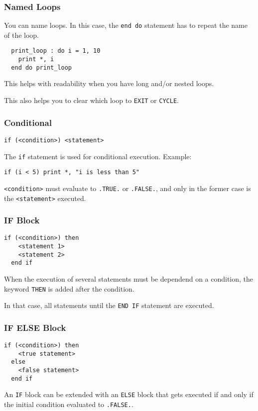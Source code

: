 \begin{frame}[fragile]
  \frametitle{Named Loops}

  You can name loops.
  In this case, the \texttt{end do} statement has to repeat the name of the loop.

  \begin{lstlisting}
  print_loop : do i = 1, 10
    print *, i
  end do print_loop
  \end{lstlisting}

  This helps with readability when you have long and/or nested loops.

  This also helps you to clear which loop to \texttt{EXIT} or \texttt{CYCLE}.

\end{frame}

\begin{frame}[fragile]
  \frametitle{Conditional}

  \begin{lstlisting}[numbers=none]
  if (<condition>) <statement>
  \end{lstlisting}
  The \texttt{if} statement is used for conditional execution.
  Example:
  \begin{lstlisting}[numbers=none]
  if (i < 5) print *, "i is less than 5"
  \end{lstlisting}

  \texttt{<condition>} must evaluate to \texttt{.TRUE.} or \texttt{.FALSE.}, and only in the former case is the \texttt{<statement>} executed.

\end{frame}

\begin{frame}[fragile]
  \frametitle{IF Block}

  \begin{lstlisting}[numbers=none]
  if (<condition>) then
    <statement 1>
    <statement 2>
  end if
  \end{lstlisting}

  When the execution of several statements must be dependend on
  a condition, the keyword \texttt{THEN} is added after the condition.

  In that case, all statements until the \texttt{END IF} statement are
  executed.

\end{frame}

\begin{frame}[fragile]
  \frametitle{IF ELSE Block}

  \begin{lstlisting}[numbers=none]
  if (<condition>) then
    <true statement>
  else
    <false statement>
  end if
  \end{lstlisting}

  An \texttt{IF} block can be extended with an \texttt{ELSE} block that
  gets executed if and only if the initial condition evaluated to \texttt{.FALSE.}.

\end{frame}

